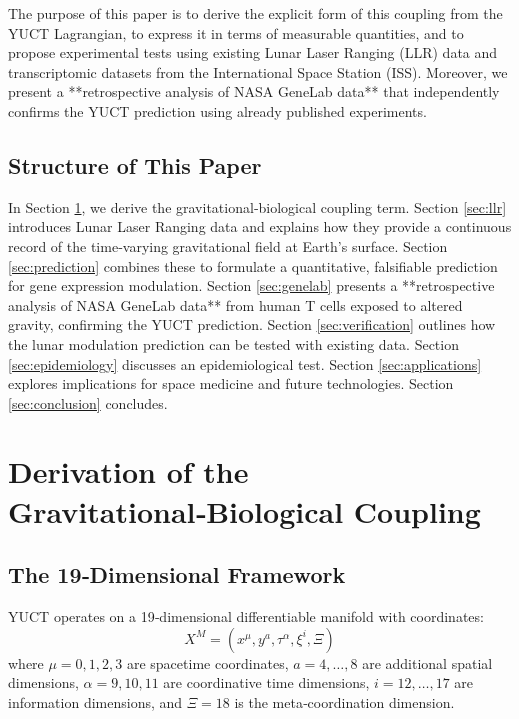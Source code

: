 \documentclass[12pt,a4paper]{article}
\theoremstyle{remark}
\begin{document}
	The purpose of this paper is to derive the explicit form of this coupling from the YUCT Lagrangian, to express it in terms of measurable quantities, and to propose experimental tests using existing Lunar Laser Ranging (LLR) data and transcriptomic datasets from the International Space Station (ISS). Moreover, we present a **retrospective analysis of NASA GeneLab data** that independently confirms the YUCT prediction using already published experiments.
	
	\subsection{Structure of This Paper}
	
	In Section \ref{sec:derivation}, we derive the gravitational‑biological coupling term. Section \ref{sec:llr} introduces Lunar Laser Ranging data and explains how they provide a continuous record of the time‑varying gravitational field at Earth's surface. Section \ref{sec:prediction} combines these to formulate a quantitative, falsifiable prediction for gene expression modulation. Section \ref{sec:genelab} presents a **retrospective analysis of NASA GeneLab data** from human T cells exposed to altered gravity, confirming the YUCT prediction. Section \ref{sec:verification} outlines how the lunar modulation prediction can be tested with existing data. Section \ref{sec:epidemiology} discusses an epidemiological test. Section \ref{sec:applications} explores implications for space medicine and future technologies. Section \ref{sec:conclusion} concludes.
	
	\section{Derivation of the Gravitational‑Biological Coupling}
	\label{sec:derivation}
	
	\subsection{The 19‑Dimensional Framework}
	
	YUCT operates on a 19‑dimensional differentiable manifold with coordinates:
	\[
	X^M = (x^\mu, y^a, \tau^\alpha, \xi^i, \Xi)
	\]
	where \(\mu = 0,1,2,3\) are spacetime coordinates, \(a = 4,\dots,8\) are additional spatial dimensions, \(\alpha = 9,10,11\) are coordinative time dimensions, \(i = 12,\dots,17\) are information dimensions, and \(\Xi = 18\) is the meta‑coordination dimension.
	
\end{document}
